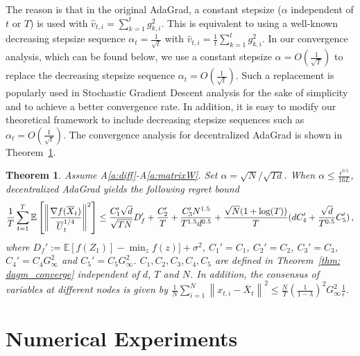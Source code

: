 \documentclass[11pt]{article}
\newtheorem{theorem}{Theorem}
\begin{document}
The reason is that in the original AdaGrad, a constant stepsize ($\alpha$ independent of $t$ or $T$) is used with  $\hat v_{t,i} = {\sum_{k=1}^t g_{k,i}^2}$. 
This is equivalent to using a well-known decreasing stepsize sequence $\alpha_t = \frac{1}{\sqrt{t}}$ with  $\hat v_{t,i} = {\frac{1}{t}\sum_{k=1}^t g_{k,i}^2}$. 
In our convergence analysis, which can be found below, we use a constant stepsize $\alpha = O(\frac{1}{\sqrt{T}})$ to replace the decreasing stepsize sequence $\alpha_t =  O(\frac{1}{\sqrt{t}})$. 
Such a replacement is popularly used in Stochastic Gradient Descent analysis for the sake of simplicity and to achieve a better convergence rate. 
In addition, it is easy to modify our theoretical framework to include decreasing stepsize sequences such as $\alpha_t =  O(\frac{1}{\sqrt{
t}})$.
The convergence analysis for decentralized AdaGrad is shown in Theorem~\ref{thm: dadagrad_converge}.
\begin{theorem}\label{thm: dadagrad_converge}
Assume A\ref{a:diff}-A\ref{a:matrixW}.
Set $\alpha = \sqrt{N}/\sqrt{Td}$. When $\alpha  \leq \frac{\epsilon^{0.5}}{16L} $, decentralized AdaGrad yields the following regret bound
	  \begin{align}\notag
 \frac{1}{T}\sum_{t=1}^T  \mathbb E \left [\left\|\frac{\nabla f( \overline X_{t})}{\overline U_{t}^{1/4}}\right\|^2  \right]
	  \leq     \frac{C_1' \sqrt{d}}{\sqrt{TN}} D_f'    +  \frac{ C_2'}{T} +  \frac{C_3' N^{1.5}}{T^{1.5}d^{0.5}}   + \frac{\sqrt{N}(1+\log (T))}{T} ( d C_4' + \frac{\sqrt{d} }{T^{0.5} }  C_5')\, ,
	  \end{align}
	where $D_f' := \mathbb E  [f( Z_{1})]  - \min_{z} f(z)]  + \sigma^2$, $C_1' = C_1$, $C_2' = C_2$, $C_3' = C_3$, $C_4' = C_4G_{\infty}^2$ and $C_5' = C_5 G_{\infty}^2 $. $C_1,C_2, C_3, C_4, C_5$ are  defined in Theorem~\ref{thm: dagm_converge} independent of $d$, $T$ and $N$. In addition, the consensus of variables at different nodes is given by $\frac{1}{N}\sum_{i=1}^N\left\| {  x_{t,i} -   \overline X_{t}}  \right\|^2   \leq \frac{N}{T} \left (\frac{1}{1-\lambda} \right)^2  G_{\infty}^2 \frac{1}{\epsilon}$. 
\end{theorem}




\newpage

\section{Numerical Experiments} \label{sec:numerical}
\end{document}
